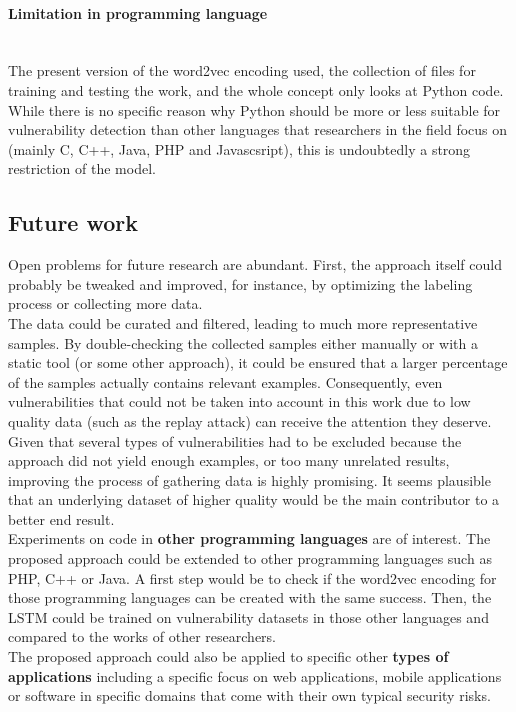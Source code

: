 \documentclass[
a4paper,
pagesize,
pdftex,
12pt,
twoside, %
BCOR=5mm, %
ngerman,
fleqn,
final,
]{scrartcl}
\begin{document}
	\paragraph{Limitation in programming language}\mbox{}\\
	The present version of the word2vec encoding used, the collection of files for training and testing the work, and the whole concept only looks at Python code. While there is no specific reason why Python should be more or less suitable for vulnerability detection than other languages that researchers in the field focus on (mainly C, C++, Java, PHP and Javascsript), this is undoubtedly a strong restriction of the model.
	
	
	\subsection{Future work}
	Open problems for future research are abundant. First, the approach itself could probably be tweaked and improved, for instance, by optimizing the labeling process or collecting more data.\\
	The data could be curated and filtered, leading to much more representative samples. By double-checking the collected samples either manually or with a static tool (or some other approach), it could be ensured that a larger percentage of the samples actually contains relevant examples. Consequently, even vulnerabilities that could not be taken into account in this work due to low quality data (such as the replay attack) can receive the attention they deserve. Given that several types of vulnerabilities had to be excluded because the approach did not yield enough examples, or too many unrelated results, improving the process of gathering data is highly promising. It seems plausible that an underlying dataset of higher quality would be the main contributor to a better end result.\\
	Experiments on code in \textbf{other programming languages} are of interest. The proposed approach could be extended to other programming languages such as PHP, C++ or Java. A first step would be to check if the word2vec encoding for those programming languages can be created with the same success. Then, the LSTM could be trained on vulnerability datasets in those other languages and compared to the works of other researchers. \\
	The proposed approach could also be applied to specific other \textbf{types of applications} including a specific focus on web applications, mobile applications or software in specific domains that come with their own typical security risks.\\
\end{document}

